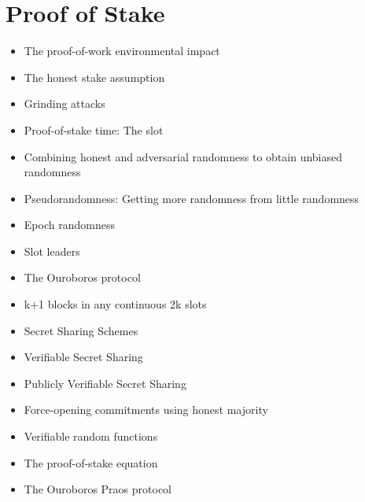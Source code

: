\chapter{Proof of Stake}

{\color{red}
\begin{itemize}
\item The proof-of-work environmental impact
\item The honest stake assumption
\item Grinding attacks
\item Proof-of-stake time: The slot
\item Combining honest and adversarial randomness to obtain unbiased randomness
\item Pseudorandomness: Getting more randomness from little randomness
\item Epoch randomness
\item Slot leaders
\item The Ouroboros protocol
\item k+1 blocks in any continuous 2k slots
\item Secret Sharing Schemes
\item Verifiable Secret Sharing
\item Publicly Verifiable Secret Sharing
\item Force-opening commitments using honest majority
\item Verifiable random functions
\item The proof-of-stake equation
\item The Ouroboros Praos protocol
\end{itemize}
}
